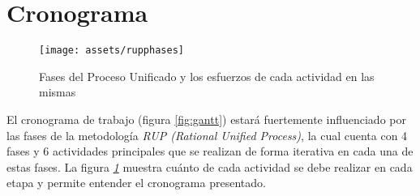 \section{Cronograma}

\begin{figure}[!ht]
    \centering
    \texttt{[image: assets/rupphases]}
    \caption{Fases del Proceso Unificado y los esfuerzos de cada actividad en las mismas}
    \label{fig:rupphases}
\end{figure}

El cronograma de trabajo (figura \ref{fig:gantt}) estará fuertemente influenciado por las fases de la metodología \textit{RUP (Rational Unified Process)}, la cual cuenta con 4 fases y 6 actividades principales que se realizan de forma iterativa en cada una de estas fases. La figura \textit{\ref{fig:rupphases}} muestra cuánto de cada actividad se debe realizar en cada etapa y permite entender el cronograma presentado.

